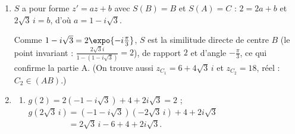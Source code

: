 \begin{description}
\begin{enumerate}
\begin{enumerate}
				Alors $f(z) = i\left[\left(\tfrac{1}{2} + i\tfrac{\sqrt{3}}{2}\right) z + 1 - i\sqrt{3}\right]$, d'où
				\par\noindent{}
			\item {}
				$-\frac{\sqrt{3}}{2} + \frac{1}{2} i = \expo{i\frac{5\pi}{6}}$ est de module $1$ et différent de $1$ : $f$ est une rotation d'angle $\frac{5\pi}{6}$.
				Son centre $\Omega$ vérifie $\omega = \expo{i\frac{5\pi}{6}}\omega + \sqrt{3} + i$, d'où
				\[
					\begin{aligned}
					\omega &= \frac{\sqrt{3} + i}{1 + \frac{\sqrt{3}}{2} - \frac{1}{2}i}
						= \frac{2(\sqrt{3}+i)}{(2+\sqrt{3}) - i}
						= \frac{2(\sqrt{3}+i)\left((2+\sqrt{3}) + i\right)}{(2+\sqrt{3})^2 + 1} \\
						&= \frac{2\left[(2\sqrt{3}+2) + (2\sqrt{3}+2) i\right]}{8 + 4\sqrt{3}}
						= \frac{(\sqrt{3}+1)(1+i)}{2+\sqrt{3}} .\end{aligned}
				\]
				Comme $\frac{\sqrt{3}+1}{2+\sqrt{3}} = (\sqrt{3}+1)(2-\sqrt{3}) = \sqrt{3} - 1$ :
				\par\noindent{}
				On retrouve la partie A : $\Omega$ est sur la droite $D_2$ d'équation $y = x$ et sur la droite $D_1$ d'équation $y = -\frac{1}{\sqrt{3}}(x-2)$.
		\end{enumerate}
		\item {}
			$S$ a pour forme $z' = az + b$ avec $S(B) = B$ et $S(A) = C$ : $2 = 2a + b$ et $2\sqrt{3}\,i = b$, d'où $a = 1 - i\sqrt{3}$.
			\par\noindent{}
			Comme $1 - i\sqrt{3} = 2\expo{-i\frac{\pi}{3}}$, $S$ est la similitude directe de centre $B$ (le point invariant : $\frac{2\sqrt{3}i}{1 - (1-i\sqrt{3})} = 2$),
			de rapport $2$ et d'angle $-\frac{\pi}{3}$, ce qui confirme la partie A.
			(On trouve aussi $z_{C_1} = 6 + 4\sqrt{3}\, i$ et $z_{C_2} = 18$, réel : $C_2 \in (AB)$.)
		\item
		\begin{enumerate}
			\item {}
				$g(2) = 2\left(-1 - i\sqrt{3}\right) + 4 + 2i\sqrt{3} = 2$ ;
				$g(2\sqrt{3}\,i) = \left(-1 - i\sqrt{3}\right)\left(-2\sqrt{3}\, i\right) + 4 + 2i\sqrt{3} $ \\ $\phantom{g(2\sqrt{3}\,i)} = 2\sqrt{3}\, i - 6 + 4 + 2i\sqrt{3}$.

\end{enumerate}
\end{enumerate}
\end{description}
